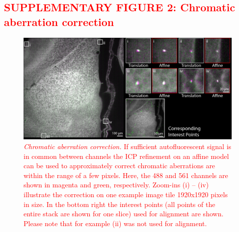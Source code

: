 \documentclass[]{spie}  %
\def\red{\textcolor{red}}
\begin{document}
\subsection*{\red{SUPPLEMENTARY FIGURE 2: Chromatic aberration correction}}
\vspace{1mm}
\begin{figure}[h!]
\includegraphics[width=\textwidth]{fig-chr_aberrations.jpg}
\vspace{-2.0mm}
\caption{\hspace{-0.5mm} \red{\emph{Chromatic aberration correction.} If sufficient autofluorescent signal is in common between channels the ICP refinement on an affine model can be used to approximately correct chromatic aberrations are within the range of a few pixels. Here, the 488 and 561 channels are shown in magenta and green, respectively. Zoom-ins (i) -- (iv) illustrate the correction on one example image tile 1920x1920 pixels in size. In the bottom right the interest points (all points of the entire stack are shown for one slice) used for alignment are shown. Please note that for example (ii) was not used for alignment.
}}
\label{fig:sup-chromatic}
\end{figure}

\pagebreak
\end{document}
